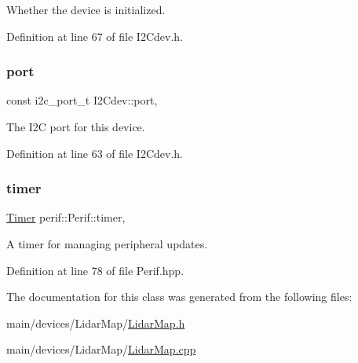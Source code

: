 Whether the device is initialized. 

Definition at line 67 of file I2\+Cdev.\+h.

\mbox{\label{classI2Cdev_a1d1e63732aa9f50369172b27a034129c}} 
\subsubsection{\texorpdfstring{port}{port}}
{\footnotesize\ttfamily const i2c\+\_\+port\+\_\+t I2\+Cdev\+::port\hspace{0.3cm}{\ttfamily [protected]}, {\ttfamily [inherited]}}

The I2C port for this device. 

Definition at line 63 of file I2\+Cdev.\+h.

\mbox{\label{classperif_1_1Perif_acfa1256201bead82ccce1a0a8bcc24e1}} 
\subsubsection{\texorpdfstring{timer}{timer}}
{\footnotesize\ttfamily \mbox{\hyperlink{classTimer}{Timer}} perif\+::\+Perif\+::timer\hspace{0.3cm}{\ttfamily [protected]}, {\ttfamily [inherited]}}

A timer for managing peripheral updates. 

Definition at line 78 of file Perif.\+hpp.



The documentation for this class was generated from the following files\+:\begin{DoxyCompactItemize}
\item 
main/devices/\+Lidar\+Map/\mbox{\hyperlink{LidarMap_8h}{Lidar\+Map.\+h}}\item 
main/devices/\+Lidar\+Map/\mbox{\hyperlink{LidarMap_8cpp}{Lidar\+Map.\+cpp}}\end{DoxyCompactItemize}
